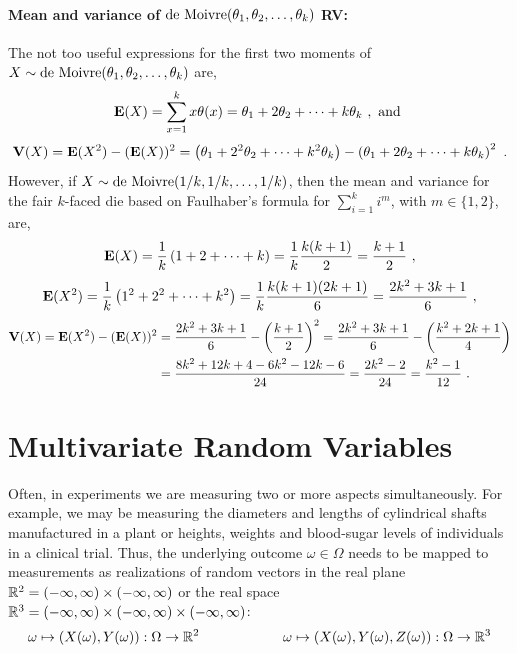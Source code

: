 \paragraph{Mean and variance of $\mbox{{\rm de~Moivre}} (\theta_1,\theta_2,\ldots,\theta_k)$ RV:}
The not too useful expressions for the first two moments of $X \sim \mbox{{\rm de~Moivre}} (\theta_1,\theta_2,\ldots,\theta_k)$ are,
\[
\mathbf{E}(X) = \sum_{x=1}^k x \theta(x) =  \theta_1 + 2 \theta_2 + \cdots + k \theta_k \ , \text{ and }
\]
\[
\mathbf{V}(X) = \mathbf{E}(X^2) - (\mathbf{E}(X))^2 =   \left(\theta_1 + 2^2 \theta_2 + \cdots + k^2 \theta_k \right) - \left( \theta_1 + 2 \theta_2 + \cdots + k \theta_k \right)^2 \ .
\]
However, if $X\sim \mbox{{\rm de~Moivre}}(1/k,1/k,\ldots,1/k)$, then the mean and variance for the fair $k$-faced die based on Faulhaber's formula for $\sum_{i=1}^k i^m$, with $m\in\{1,2\}$, are,
\[
\e(X) = \frac{1}{k} \left( 1+2+\cdots+k \right)= \frac{1}{k} \frac{k(k+1)}{2} = \frac{k+1}{2}  \ ,
\]
\[
\mathbf{E}(X^2) = \frac{1}{k} \left( 1^2+2^2+\cdots+k^2 \right)  = \frac{1}{k} \frac{k(k+1)(2k+1)}{6} =  \frac{2k^2+3k+1}{6} \ ,
\]
\begin{align}
\mathbf{V}(X) = \mathbf{E}(X^2) - (\mathbf{E}(X))^2
&= \frac{2k^2+3k+1}{6} -  \left( \frac{k+1}{2} \right)^2 = \frac{2k^2+3k+1}{6} -  \left( \frac{k^2+2k+1}{4} \right) \notag \\
&=  \frac{8k^2+12k+4 - 6k^2-12k-6}{24} =  \frac{2k^2-2}{24} = \frac{k^2-1}{12} \notag \ .
\end{align}




\section{Multivariate Random Variables}\label{S:RVecs}

Often, in experiments we are measuring two or more aspects simultaneously.  
For example, we may be measuring the diameters and lengths of cylindrical shafts manufactured in a plant or heights, weights and blood-sugar levels of individuals in a clinical trial.  
Thus, the underlying outcome $\omega \in \Omega$ needs to be mapped to measurements as realizations of random vectors in the real plane $\mathbb{R}^2 = (-\infty, \infty) \times (-\infty, \infty)$ or the real space $\mathbb{R}^3 = (-\infty, \infty) \times (-\infty, \infty) \times (-\infty, \infty)$:
\[
\omega \mapsto \left( X(\omega),Y(\omega) \right) : \Omega \to \mathbb{R}^2  \qquad \qquad \qquad \omega \mapsto \left( X(\omega),Y(\omega), Z(\omega) \right) : \Omega \to \mathbb{R}^3
\]

